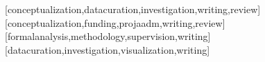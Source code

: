 \documentclass[english]{textolivre}
\begin{document}
\printbibliography\label{sec-bib}


\begin{contributors}
[conceptualization,datacuration,investigation,writing,review]
[conceptualization,funding,projaadm,writing,review]
[formalanalysis,methodology,supervision,writing]
[datacuration,investigation,visualization,writing]
\end{contributors}
\end{document}
